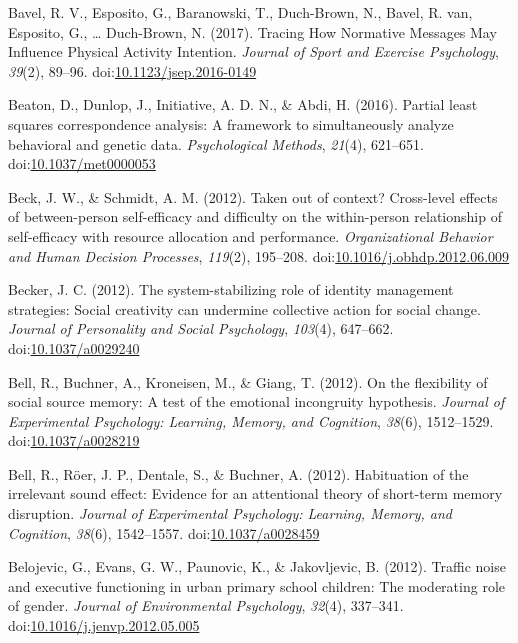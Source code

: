 \documentclass[english,man]{apa6}
\theoremstyle{definition}
\theoremstyle{definition}
\theoremstyle{definition}
\theoremstyle{remark}
\begin{document}
\hypertarget{ref-VanBavel2017}{}
Bavel, R. V., Esposito, G., Baranowski, T., Duch-Brown, N., Bavel, R.
van, Esposito, G., \ldots{} Duch-Brown, N. (2017). Tracing How Normative
Messages May Influence Physical Activity Intention. \emph{Journal of
Sport and Exercise Psychology}, \emph{39}(2), 89--96.
doi:\href{https://doi.org/10.1123/jsep.2016-0149}{10.1123/jsep.2016-0149}

\hypertarget{ref-Beaton2016}{}
Beaton, D., Dunlop, J., Initiative, A. D. N., \& Abdi, H. (2016).
Partial least squares correspondence analysis: A framework to
simultaneously analyze behavioral and genetic data. \emph{Psychological
Methods}, \emph{21}(4), 621--651.
doi:\href{https://doi.org/10.1037/met0000053}{10.1037/met0000053}

\hypertarget{ref-Beck2012}{}
Beck, J. W., \& Schmidt, A. M. (2012). Taken out of context? Cross-level
effects of between-person self-efficacy and difficulty on the
within-person relationship of self-efficacy with resource allocation and
performance. \emph{Organizational Behavior and Human Decision
Processes}, \emph{119}(2), 195--208.
doi:\href{https://doi.org/10.1016/j.obhdp.2012.06.009}{10.1016/j.obhdp.2012.06.009}

\hypertarget{ref-Becker2012}{}
Becker, J. C. (2012). The system-stabilizing role of identity management
strategies: Social creativity can undermine collective action for social
change. \emph{Journal of Personality and Social Psychology},
\emph{103}(4), 647--662.
doi:\href{https://doi.org/10.1037/a0029240}{10.1037/a0029240}

\hypertarget{ref-Bell2012}{}
Bell, R., Buchner, A., Kroneisen, M., \& Giang, T. (2012). On the
flexibility of social source memory: A test of the emotional incongruity
hypothesis. \emph{Journal of Experimental Psychology: Learning, Memory,
and Cognition}, \emph{38}(6), 1512--1529.
doi:\href{https://doi.org/10.1037/a0028219}{10.1037/a0028219}

\hypertarget{ref-Bell2012a}{}
Bell, R., Röer, J. P., Dentale, S., \& Buchner, A. (2012). Habituation
of the irrelevant sound effect: Evidence for an attentional theory of
short-term memory disruption. \emph{Journal of Experimental Psychology:
Learning, Memory, and Cognition}, \emph{38}(6), 1542--1557.
doi:\href{https://doi.org/10.1037/a0028459}{10.1037/a0028459}

\hypertarget{ref-Belojevic2012}{}
Belojevic, G., Evans, G. W., Paunovic, K., \& Jakovljevic, B. (2012).
Traffic noise and executive functioning in urban primary school
children: The moderating role of gender. \emph{Journal of Environmental
Psychology}, \emph{32}(4), 337--341.
doi:\href{https://doi.org/10.1016/j.jenvp.2012.05.005}{10.1016/j.jenvp.2012.05.005}
\end{document}
